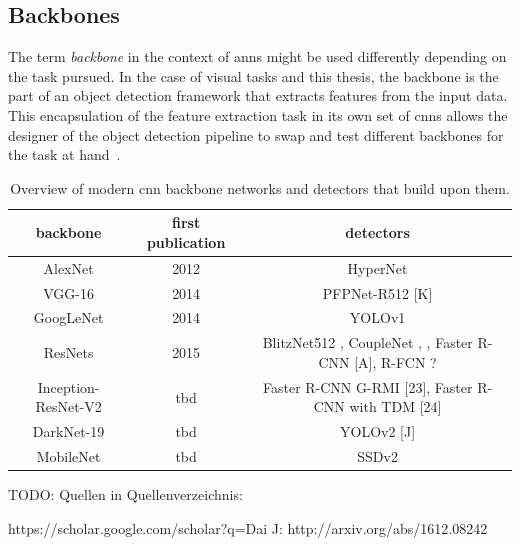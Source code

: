 \documentclass[
			   fontsize=11pt,
               paper=a4,
               bibliography=totoc,
               idxtotoc,
               headsepline,
               footsepline,
               footinclude=false,
               BCOR=12mm,
               DIV=13,
               openany,   %
               ]
               {scrbook}
\begin{document}
\subsection{Backbones} \label{ssec:backbones}

The term \textit{backbone} in the context of \glspl{ann} might be used differently depending on the task pursued. In the case of visual tasks and this thesis, the backbone is the part of an object detection framework that extracts features from the input data. This encapsulation of the feature extraction task in its own set of \glspl{cnn} allows the designer of the object detection pipeline to swap and test different backbones for the task at hand~\cite{backbones}.

\begin{table}[H]
	\begin{tabularx}{\columnwidth}{C | C | C}
		\hline
		backbone					& first publication & detectors \\
		\hline \hline
		AlexNet						  & 2012 \cite{backboneAlexNet}			& HyperNet \cite{detectorHyperNet} \\
		\hline
		VGG-16						 & 2014 \cite{backboneVGG}			   & PFPNet-R512 [K] \\
		\hline
		GoogLeNet			   	   & 2014 \cite{backboneGoogLeNet}			 & YOLOv1 \cite{detectorYOLOv1} \\
		\hline
		ResNets					  	  & 2015 \cite{backboneResNet}		   & BlitzNet512 \cite{detectorBlitzNet}, CoupleNet \cite{detectorCoupleNet}, \cite{detectorRetinaNet},  Faster R-CNN [A], R-FCN ? \\
		\hline
		Inception-ResNet-V2   & tbd					  & Faster R-CNN G-RMI [23], Faster R-CNN with TDM [24] \\
		\hline
		DarkNet-19					& tbd					& YOLOv2 [J] \\
		\hline
		MobileNet					 & tbd					 & SSDv2 \\		
	\end{tabularx}
	\caption[Modern CNN Backbones and Detectors]{Overview of modern \gls{cnn} backbone networks and detectors that build upon them.}
	\label{tab:backbonesDetectors}
\end{table}

TODO: Quellen in Quellenverzeichnis:


 https://scholar.google.com/scholar?q=Dai%
J: http://arxiv.org/abs/1612.08242
\end{document}
